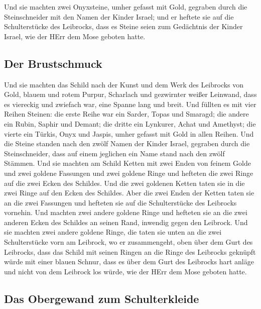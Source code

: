  Und sie machten zwei Onyxsteine, umher gefasst mit Gold,
gegraben durch die Steinschneider mit den Namen der Kinder Israel;
 und er heftete sie auf die Schulterstücke des Leibrocks,
dass es Steine seien zum Gedächtnis der Kinder Israel, wie der HErr dem
Mose geboten hatte.

\hypertarget{der-brustschmuck}{%
\subsection{Der Brustschmuck}\label{der-brustschmuck}}

 Und sie machten das Schild nach der Kunst und dem Werk
des Leibrocks von Gold, blauem und rotem Purpur, Scharlach und
gezwirnter weißer Leinwand,  dass es viereckig und
zwiefach war, eine Spanne lang und breit.  Und füllten es
mit vier Reihen Steinen: die erste Reihe war ein Sarder, Topas und
Smaragd;  die andere ein Rubin, Saphir und Demant;
 die dritte ein Lynkurer, Achat und Amethyst;
 die vierte ein Türkis, Onyx und Jaspis, umher gefasst
mit Gold in allen Reihen.  Und die Steine standen nach
den zwölf Namen der Kinder Israel, gegraben durch die Steinschneider,
dass auf einem jeglichen ein Name stand nach den zwölf Stämmen.
 Und sie machten am Schild Ketten mit zwei Enden von
feinem Golde  und zwei goldene Fassungen und zwei goldene
Ringe und hefteten die zwei Ringe auf die zwei Ecken des Schildes.
 Und die zwei goldenen Ketten taten sie in die zwei Ringe
auf den Ecken des Schildes.  Aber die zwei Enden der
Ketten taten sie an die zwei Fassungen und hefteten sie auf die
Schulterstücke des Leibrocks vornehin.  Und machten zwei
andere goldene Ringe und hefteten sie an die zwei anderen Ecken des
Schildes an seinen Rand, inwendig gegen den Leibrock. 
Und sie machten zwei andere goldene Ringe, die taten sie unten an die
zwei Schulterstücke vorn am Leibrock, wo er zusammengeht, oben über dem
Gurt des Leibrocks,  dass das Schild mit seinen Ringen an
die Ringe des Leibrocks geknüpft würde mit einer blauen Schnur, dass es
über dem Gurt des Leibrocks hart anläge und nicht von dem Leibrock los
würde, wie der HErr dem Mose geboten hatte.

\hypertarget{das-obergewand-zum-schulterkleide}{%
\subsection{Das Obergewand zum
Schulterkleide}\label{das-obergewand-zum-schulterkleide}}

